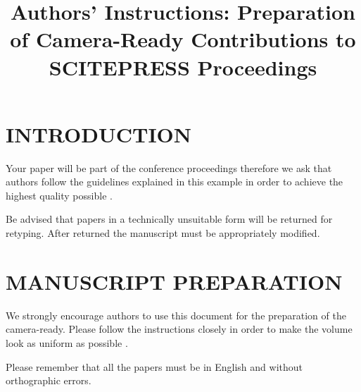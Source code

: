 \documentclass[a4paper,twoside]{article}
\begin{document}
\title{Authors' Instructions: Preparation of Camera-Ready Contributions to SCITEPRESS Proceedings}

\author{
}



\onecolumn \maketitle \normalsize \setcounter{footnote}{0} \vfill

\section{\uppercase{Introduction}}
\label{sec:introduction}

Your paper will be part of the conference proceedings
therefore we ask that authors follow the guidelines explained in
this example in order to achieve the highest quality possible
\cite{Smith98}.

Be advised that papers in a technically unsuitable form will be
returned for retyping. After returned the manuscript must be
appropriately modified.

\section{\uppercase{Manuscript Preparation}}

We strongly encourage authors to use this document for the
preparation of the camera-ready. Please follow the instructions
closely in order to make the volume look as uniform as possible
\cite{Moore99}.

Please remember that all the papers must be in English and without
orthographic errors.
\end{document}
